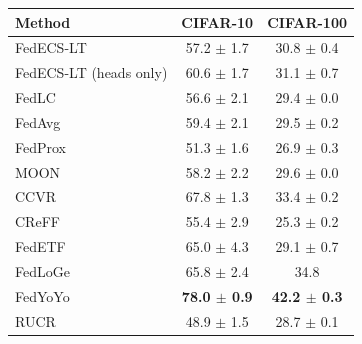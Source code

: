 \begin{tabular}{lcc}
\toprule
Method & CIFAR-10 & CIFAR-100\\
\midrule
FedECS-LT & 57.2 $\pm$ 1.7 & 30.8 $\pm$ 0.4\\
FedECS-LT (heads only) & 60.6 $\pm$ 1.7 & 31.1 $\pm$ 0.7\\
FedLC & 56.6 $\pm$ 2.1 & 29.4 $\pm$ 0.0\\
FedAvg & 59.4 $\pm$ 2.1 & 29.5 $\pm$ 0.2\\
FedProx & 51.3 $\pm$ 1.6 & 26.9 $\pm$ 0.3\\
MOON & 58.2 $\pm$ 2.2 & 29.6 $\pm$ 0.0\\
CCVR & 67.8 $\pm$ 1.3 & 33.4 $\pm$ 0.2\\
CReFF & 55.4 $\pm$ 2.9 & 25.3 $\pm$ 0.2\\
FedETF & 65.0 $\pm$ 4.3 & 29.1 $\pm$ 0.7\\
FedLoGe & 65.8 $\pm$ 2.4 & 34.8\\
FedYoYo & \textbf{78.0 $\pm$ 0.9} & \textbf{42.2 $\pm$ 0.3}\\
RUCR & 48.9 $\pm$ 1.5 & 28.7 $\pm$ 0.1\\
\bottomrule
\end{tabular}
